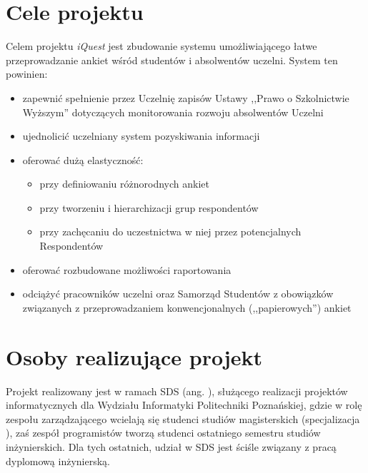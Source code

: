\section{Cele projektu}
\label{Chapter13}

Celem projektu \textit{iQuest} jest zbudowanie systemu umożliwiającego łatwe przeprowadzanie ankiet wśród studentów i absolwentów uczelni. System ten powinien:
\begin{itemize}
\item{zapewnić spełnienie przez Uczelnię zapisów Ustawy ,,Prawo o Szkolnictwie Wyższym'' dotyczących monitorowania rozwoju absolwentów Uczelni\cite{AP:PoSW05}}
\item{ujednolicić uczelniany system pozyskiwania informacji}
\item{oferować dużą elastyczność:
\begin{itemize}
\item{przy definiowaniu różnorodnych ankiet}
\item{przy tworzeniu i hierarchizacji grup respondentów}
\item{przy zachęcaniu do uczestnictwa w niej przez potencjalnych Respondentów}
\end{itemize}}
\item{oferować rozbudowane możliwości raportowania}
\item{odciążyć pracowników uczelni oraz Samorząd Studentów z obowiązków związanych z przeprowadzaniem konwencjonalnych (,,papierowych'') ankiet}
\end{itemize}

\section{Osoby realizujące projekt}
\label{Chapter14}

Projekt realizowany jest w ramach SDS (ang. ), służącego realizacji projektów informatycznych dla Wydziału Informatyki Politechniki Poznańskiej, gdzie w rolę zespołu zarządzającego wcielają się studenci studiów magisterskich (specjalizacja ), zaś zespół programistów tworzą studenci ostatniego semestru studiów inżynierskich. Dla tych ostatnich, udział w SDS jest ściśle związany z pracą dyplomową inżynierską. \\

